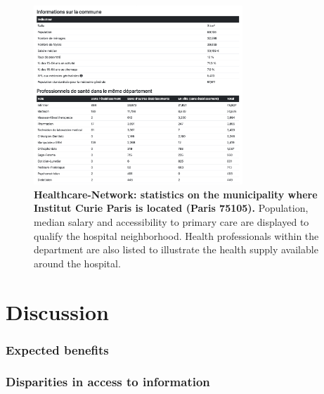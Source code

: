 \begin{figure}[H]
    \includegraphics[width=0.7\textwidth]{images/healthcare-network/curie-commune.png}
    \centering
    \caption{
        \textbf{Healthcare-Network: statistics on the municipality where Institut Curie Paris is located (Paris 75105).} Population, median salary and accessibility to primary care are displayed to qualify the hospital neighborhood. Health professionals within the department are also listed to illustrate the health supply available around the hospital.
    }
    \label{fig:hn-curie-commune}
\end{figure}

\section{Discussion}

\subsubsection{Expected benefits}

\subsubsection{Disparities in access to information}

